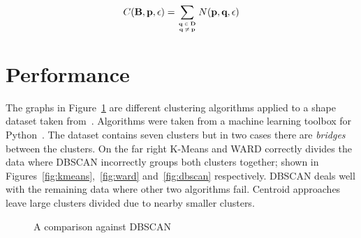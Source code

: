 \documentclass{ecsarticle}     %
\begin{document}
\begin{equation}
	C(\textbf{B},\textbf{p},\epsilon) = \sum\limits_{\textbf{q}\:\in\:\textbf{D}\atop\textbf{q}\:\neq\:\textbf{p}} N(\textbf{p},\textbf{q},\epsilon)
	\label{eqn:optimised}
\end{equation}

\section{Performance}

The graphs in Figure~\ref{fig:compare} are different clustering algorithms applied to a shape dataset taken from~\cite{gionis05cluster}. 
Algorithms were taken from a machine learning toolbox for Python~\citep{scikit13ml}.
The dataset contains seven clusters but in two cases there are \emph{bridges} between the clusters.
On the far right K-Means and WARD correctly divides the data where DBSCAN incorrectly groups both clusters together; shown in Figures~\ref{fig:kmeans},~\ref{fig:ward} and~\ref{fig:dbscan} respectively.
DBSCAN deals well with the remaining data where other two algorithms fail.
Centroid approaches leave large clusters divided due to nearby smaller clusters.


\begin{figure}[ht]
   \centering
   \caption{A comparison against DBSCAN}
   \label{fig:compare}
\end{figure}
\end{document}
